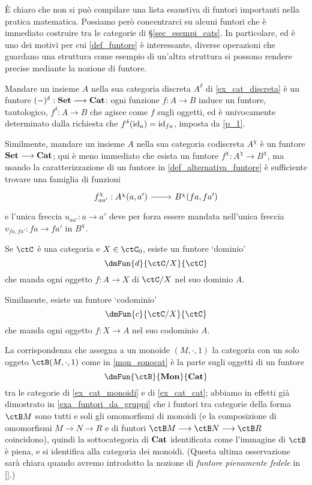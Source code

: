 \`E chiaro che non si può compilare una lista esaustiva di funtori importanti nella pratica matematica. Possiamo però concentrarci su alcuni funtori che è immediato costruire tra le categorie di §\ref{sec_esempi_cats}. In particolare, ed è uno dei motivi per cui \ref{def_funtore} è interessante, diverse operazioni che guardano una struttura come esempio di un'altra struttura si possono rendere precise mediante la nozione di funtore.
\begin{example}
	Mandare un insieme \(A\) nella sua categoria discreta \(A^\delta\) di \ref{ex_cat_discreta} è un funtore \((-)^\delta : \mathbf{Set} \longrightarrow \mathbf{Cat}\): ogni funzione \(f : A \to B\) induce un funtore, tautologico, \(f^\delta : A \to B\) che agisce come \(f\) sugli oggetti, ed è univocamente determinato dalla richiesta che \(f^\delta(\mathrm{id}_a) = \mathrm{id}_{fa}\), imposta da \ref{p_1}.

	Similmente, mandare un insieme \(A\) nella sua categoria codiscreta \(A^\chi\) è un funtore \(\mathbf{Set} \longrightarrow\mathbf{Cat}\); qui è meno immediato che esista un funtore \(f^\chi : A^\chi\to B^\chi\), ma usando la caratterizzazione di un funtore in \ref{def_alternativa_funtore} è sufficiente trovare una famiglia di funzioni
	\[\begin{tikzcd}
			f^\chi_{aa'} : \Hom{A^\chi}(a,a') \ar[r] & \Hom{B^\chi}(fa, fa')
		\end{tikzcd}\]
	e l'unica freccia \(u_{aa'} : a\to a'\) deve per forza essere mandata nell'unica freccia \(v_{fa,fa'} : fa \to fa'\) in \(B^\chi\).
\end{example}
\begin{example}
	Se \(\ctC\) è una categoria e \(X\in\ctC_0\), esiste un funtore `dominio'
	\[\dmFun{d}{\ctC/X}{\ctC}\]
	che manda ogni oggetto \(f : A\to X\) di \(\ctC/X\) nel suo dominio \(A\).

	Similmente, esiste un funtore `codominio'
	\[\dmFun{c}{\ctC/X}{\ctC}\]
	che manda ogni oggetto \(f : X\to A\) nel suo codominio \(A\).
\end{example}
\begin{example}
	La corrispondenza che assegna a un monoide \((M,\cdot,1)\) la categoria con un solo oggeto \(\ctB(M,\cdot,1)\) come in \ref{mon_sonocat} è la parte sugli oggetti di un funtore
	\[\dmFun{\ctB}{\ctMon}{\ctCat}\]
	tra le categorie di \ref{ex_cat_monoidi} e di \ref{ex_cat_cat}; abbiamo in effetti già dimostrato in \ref{exa_funtori_da_gruppi} che i funtori tra categorie della forma \(\ctB M\) sono tutti e soli gli omomorfismi di monoidi (e la composizione di omomorfismi \(M\to N\to R\) e di funtori \(\ctB M \fun\ctB N \fun\ctB R\) coincidono), quindi la sottocategoria di \(\mathbf{Cat}\) identificata come l'immagine di \(\ctB\) è piena, e si identifica alla categoria dei monoidi. (Questa ultima osservazione sarà chiara quando avremo introdotto la nozione di \emph{funtore pienamente fedele} in \ref{}.)
\end{example}
